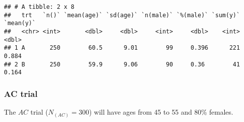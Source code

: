 \documentclass[
]{article}
\begin{document}
\begin{verbatim}
## # A tibble: 2 x 8
##   trt   `n()` `mean(age)` `sd(age)` `n(male)` `%(male)` `sum(y)` `mean(y)`
##   <chr> <int>       <dbl>     <dbl>     <int>     <dbl>    <int>     <dbl>
## 1 A       250        60.5      9.01        99     0.396      221     0.884
## 2 B       250        59.9      9.06        90     0.36        41     0.164
\end{verbatim}

\hypertarget{ac-trial}{%
\subsubsection{AC trial}\label{ac-trial}}

The \(AC\) trial (\(N_{(AC)}=300\)) will have ages from 45 to 55 and
80\% females.
\end{document}
